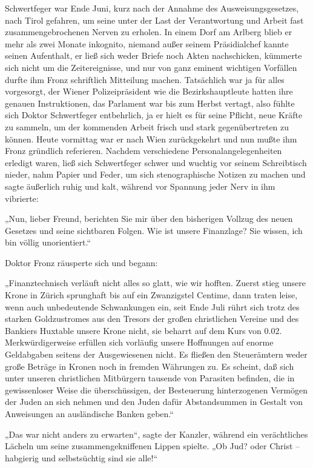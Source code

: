 Schwertfeger war Ende Juni, kurz nach der Annahme des
Ausweisungsgesetzes, nach Tirol gefahren, um seine unter der Last
der Verantwortung und Arbeit fast zusammengebrochenen Nerven zu
erholen. In einem Dorf am Arlberg blieb er mehr als zwei Monate
inkognito, niemand außer seinem Präsidialchef kannte seinen
Aufenthalt, er ließ sich weder Briefe noch Akten nachschicken,
kümmerte sich nicht um die Zeitereignisse, und nur von ganz eminent
wichtigen Vorfällen durfte ihm Fronz schriftlich Mitteilung machen.
Tatsächlich war ja für alles vorgesorgt, der Wiener
Polizeipräsident wie die Bezirkshauptleute hatten ihre genauen
Instruktionen, das Parlament war bis zum Herbst vertagt, also
fühlte sich Doktor Schwertfeger entbehrlich, ja er hielt es für
seine Pflicht, neue Kräfte zu sammeln, um der kommenden Arbeit
frisch und stark gegenübertreten zu können. Heute vormittag war er
nach Wien zurückgekehrt und nun mußte ihm Fronz gründlich
referieren.  Nachdem verschiedene
Personalangelegenheiten erledigt waren, ließ sich Schwertfeger
schwer und wuchtig vor seinem Schreibtisch nieder, nahm Papier und
Feder, um sich stenographische Notizen zu machen und sagte
äußerlich ruhig und kalt, während vor Spannung jeder Nerv in ihm
vibrierte:

„Nun, lieber Freund, berichten Sie mir über den bisherigen Vollzug
des neuen Gesetzes und seine sichtbaren Folgen. Wie ist unsere
Finanzlage? Sie wissen, ich bin völlig unorientiert.“

Doktor Fronz räusperte sich und begann:

„Finanztechnisch verläuft nicht alles so glatt, wie wir hofften.
Zuerst stieg unsere Krone in Zürich sprunghaft bis auf ein
Zwanzigstel Centime, dann traten leise, wenn auch unbedeutende
Schwankungen ein, seit Ende Juli rührt sich trotz des starken
Goldzustromes aus den Tresors der großen christlichen Vereine und
des Bankiers Huxtable unsere Krone nicht, sie beharrt auf dem Kurs
von 0.02. Merkwürdigerweise erfüllen sich vorläufig unsere
Hoffnungen auf enorme Geldabgaben seitens der Ausgewiesenen nicht.
Es fließen den Steuerämtern weder große Beträge in Kronen noch in
fremden Währungen zu. Es scheint, daß sich unter unseren
christlichen Mitbürgern tausende von Parasiten befinden, die in
gewissenloser Weise die überschüssigen, der Besteuerung
hinterzogenen Vermögen der Juden an sich nehmen und den Juden dafür
Abstandsummen in Gestalt von Anweisungen an ausländische Banken
geben.“

„Das war nicht anders zu erwarten“, sagte der
Kanzler, während ein verächtliches Lächeln um seine
zusammengekniffenen Lippen spielte. „Ob Jud? oder Christ –
habgierig und selbstsüchtig sind sie alle!“

